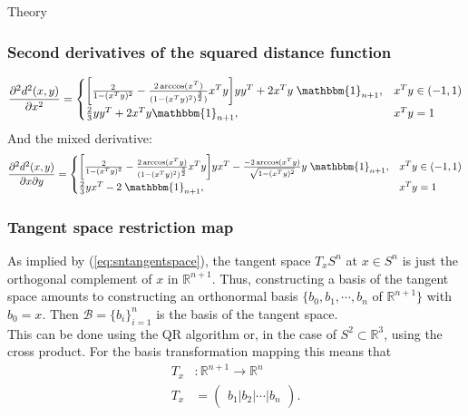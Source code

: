 \begin{chapter}{Theory}
\subsubsection{Second derivatives of the squared distance function} %
\label{ssub:SecondDerS2}
\begin{equation}
    \frac{\partial^2 d^2(x,y)}{\partial x^2}=\begin{cases}
	\bigg[\frac{2}{1-(x^Ty)^2}-\frac{2\arccos(x^T)}{(1-(x^Ty)^{2})^{\frac{3}{2}})}x^Ty\bigg]yy^T+2x^Ty\;\mathbbm{1}_{n+1}, & x^Ty\in(-1,1)\\
	\frac{2}{3}yy^T+2x^Ty\mathbbm{1}_{n+1}, & x^Ty=1
    \end{cases}
\end{equation}
And the mixed derivative:
\begin{equation}
    \frac{\partial^2 d^2(x,y)}{\partial x\partial y}=\begin{cases}
	\bigg[\frac{2}{1-(x^Ty)^2}-\frac{2\arccos(x^Ty)}{(1-(x^Ty)^{2})^{\frac{3}{2}}}x^Ty\bigg]yx^T-\frac{-2\arccos(x^Ty)}{\sqrt{1-(x^Ty)^{2}}}y\;\mathbbm{1}_{n+1} , & x^Ty\in(-1,1)\\
	\frac{2}{3}yx^T -2\;\mathbbm{1}_{n+1}, & x^Ty=1
    \end{cases}
\end{equation}


\subsubsection{Tangent space restriction map} %
\label{ssub:TangentS2}
As implied by (\ref{eq:sntangentspace}), the tangent space $T_xS^n$ at $x\in S^n$ is just the orthogonal complement of $x$ in $\mathbb{R}^{n+1}$.
Thus, constructing a basis of the tangent space amounts to constructing an orthonormal basis $\lbrace b_0,b_1,\cdots,b_n$ of $\mathbb{R}^{n+1}\rbrace$ with $b_0=x$. Then
$\mathcal{B}=\lbrace b_i\rbrace_{i=1}^{n}$ is the basis of the tangent space.\\
This can be done using the QR algorithm or, in the case of $S^2\subset\mathbb{R}^3$, using the cross product. For the basis transformation mapping this means that
\begin{align}
    T_x &: \mathbb{R}^{n+1}\to \mathbb{R}^{n}\\
    T_x &= \begin{pmatrix}
    b_1 | b_2 | \cdots | b_n
    \end{pmatrix}.
\end{align}


\end{chapter}
